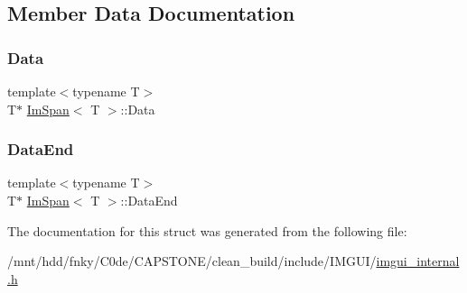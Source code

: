 \subsection{Member Data Documentation}
\mbox{\label{structImSpan_a9cb5f8d45dff07a275c97b4d07915878}} 
\subsubsection{\texorpdfstring{Data}{Data}}
{\footnotesize\ttfamily template$<$typename T$>$ \\
T$\ast$ \hyperlink{structImSpan}{Im\+Span}$<$ T $>$\+::Data}

\mbox{\label{structImSpan_a15a821b2ed71c9e447611cb3fe21d16c}} 
\subsubsection{\texorpdfstring{Data\+End}{DataEnd}}
{\footnotesize\ttfamily template$<$typename T$>$ \\
T$\ast$ \hyperlink{structImSpan}{Im\+Span}$<$ T $>$\+::Data\+End}



The documentation for this struct was generated from the following file\+:\begin{DoxyCompactItemize}
\item 
/mnt/hdd/fnky/\+C0de/\+C\+A\+P\+S\+T\+O\+N\+E/clean\+\_\+build/include/\+I\+M\+G\+U\+I/\hyperlink{imgui__internal_8h}{imgui\+\_\+internal.\+h}\end{DoxyCompactItemize}
